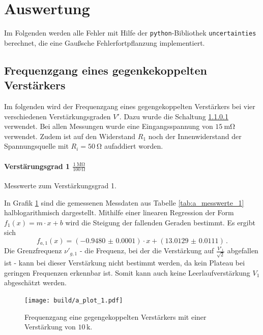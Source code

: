 \section{Auswertung}
\label{sec:auswertung}
Im Folgenden werden alle Fehler mit Hilfe der \texttt{python}-Bibliothek
\texttt{uncertainties}\cite{py-uncertainties} berechnet, die eine Gaußsche
Fehlerfortpflanzung implementiert.

\subsection{Frequenzgang eines gegenkekoppelten Verstärkers} %

Im folgenden wird der Frequenzgang eines gegengekoppelten Verstärkers bei vier verschiedenen Verstärkungsgraden $V'$.
Dazu wurde die Schaltung \ref{} verwendet.
Bei allen Messungen wurde eine Eingangsspannung von $\SI{15}{\milli\ohm}$ verwendet.
Zudem ist auf den Widerstand $R_1$ noch der Innenwiderstand der Spannungsquelle mit $R_i = \SI{50}{\ohm}$ aufaddiert worden.

\paragraph{Verstärungsgrad 1 $\frac{\SI{1}{\mega\ohm}}{\SI{100}{\ohm}}$}

\begin{table}
\centering
\caption{Messwerte zum Verstärkungsgrad 1.}
    \label{tab:a_messwerte_1}
    
\end{table}

In Grafik \ref{fig:a_plot_1} sind die gemessenen Messdaten aus Tabelle \ref{tab:a_messwerte_1} halblogarithmisch dargestellt.
Mithilfe einer linearen Regression der Form $f_1(x)= m \cdot x + b$ wird die Steigung der fallenden Geraden bestimmt.
Es ergibt sich
\begin{equation*}
	f_{a,1}(x) = (\num{-0.9480(1)}) \cdot x + (\num{13.0129(111)})\,.
\end{equation*}
Die Grenzfrequenz $\nu'_{g,1}$ - die Frequenz, bei der die Verstärkung auf $\frac{V'_1}{\sqrt{2}}$ abgefallen ist - kann bei dieser Verstärkung nicht bestimmt werden, da kein Plateau bei geringen Frequenzen erkennbar ist.
Somit kann auch keine Leerlaufverstärkung $V_1$ abgeschätzt werden.

\begin{figure}[h!]
    \centering
    \texttt{[image: build/a\_plot\_1.pdf]}
    \caption{Frequenzgang eine gegengekoppelten Verstärkers mit einer Verstärkung von $10\,\mathrm{k}$.}
    \label{fig:a_plot_1}
\end{figure}

